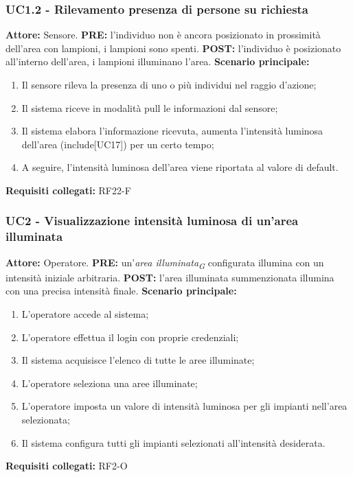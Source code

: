 \documentclass[a4paper, 12pt]{article}
\begin{document}
\subsubsection{UC1.2 - Rilevamento presenza di persone su richiesta}
\textbf{Attore:} Sensore.\newline
\textbf{PRE:} l'individuo non è ancora posizionato in prossimità dell'area con lampioni, i lampioni sono spenti.\newline
\textbf{POST:} l'individuo è posizionato all'interno dell'area, i lampioni illuminano l'area.\newline
\textbf{Scenario principale:}
\begin{enumerate}
    \item Il sensore rileva la presenza di uno o più individui nel raggio d'azione;
    \item Il sistema riceve in modalità pull le informazioni dal sensore;
    \item Il sistema elabora l'informazione ricevuta, aumenta l'intensità luminosa dell'area (include[UC17]) per un certo tempo;
    \item A seguire, l'intensità luminosa dell'area viene riportata al valore di default.
\end{enumerate}
\textbf{Requisiti collegati:} RF22-F\newline

\subsubsection{UC2 - Visualizzazione intensità luminosa di un'area illuminata}
\textbf{Attore:} Operatore.\newline
\textbf{PRE:} un'\textit{area illuminata\textsubscript{G}} configurata illumina con un intensità iniziale arbitraria.\newline
\textbf{POST:} l'area illuminata summenzionata illumina con una precisa intensità finale.\newline
\textbf{Scenario principale:}
\begin{enumerate}
    \item L'operatore accede al sistema;
    \item L'operatore effettua il login con proprie credenziali;
    \item Il sistema acquisisce l'elenco di tutte le aree illuminate;
    \item L'operatore seleziona una aree illuminate;
    \item L'operatore imposta un valore di intensità luminosa per gli impianti nell'area selezionata;
    \item Il sistema configura tutti gli impianti selezionati all'intensità desiderata.
\end{enumerate}
\textbf{Requisiti collegati:} RF2-O\newline
\end{document}
